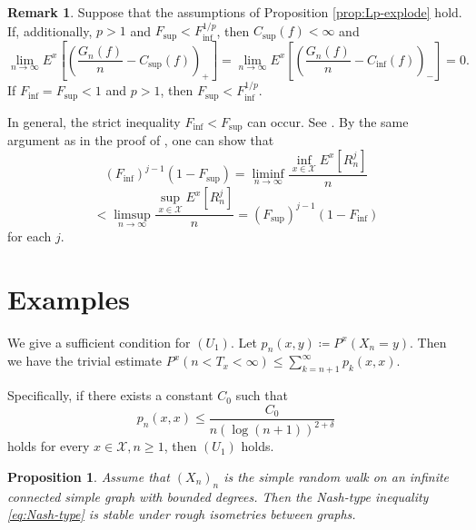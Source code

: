 \documentclass[a4paper, reqno, 11pt]{amsart}
\newtheorem{Prop}[Thm]{Proposition}
\theoremstyle{definition}
\newtheorem{Rem}[Thm]{Remark}
\begin{document}
\begin{Rem}
Suppose that the assumptions of Proposition \ref{prop:Lp-explode} hold. 
If, additionally, $p > 1$ and $F_{\sup} < F_{\inf}^{1/p}$, 
then $C_{\sup}(f) < \infty$ and 
\[ \lim_{n \to \infty} E^x \left[ \left( \frac{G_n (f)}{n} - C_{\sup}(f) \right)_{+} \right] =  \lim_{n \to \infty} E^x \left[ \left( \frac{G_n (f)}{n} - C_{\inf}(f) \right)_{-} \right] = 0. \] 
If $F_{\inf} = F_{\sup} < 1$ and $p >1$,  then $F_{\sup} < F_{\inf}^{1/p}$. 
\end{Rem}

In general, the strict inequality $F_{\inf} < F_{\sup}$ can occur. 
See \cite[Theorem 1.3]{Okamura2014}. 
By the same argument as in the proof of  \cite[Theorem 1.3]{Okamura2014}, 
one can show that 
\[ (F_{\inf})^{j-1} (1-F_{\sup}) =  \liminf_{n \to \infty} \frac{\inf_{x \in \mathcal{X}} E^{x} \left[R_n^j \right]}{n} \]
\[ < \limsup_{n \to \infty} \frac{\sup_{x \in \mathcal{X}} E^{x} \left[R_n^j \right]}{n} = (F_{\sup})^{j-1} (1-F_{\inf}) \]
for each $j$. 


\section{Examples}\label{sec:examples}

We give a sufficient condition for $(U_1)$. 
Let $p_n (x,y) \coloneqq P^x (X_n = y)$. 
Then we have the trivial estimate 
$P^x (n < T_x < \infty) \le \sum_{k=n+1}^{\infty} p_k (x,x)$. 

Specifically, if 
there exists a constant  $C_0$ such that
\begin{equation}\label{eq:Nash-type}
p_n (x,x) \le \frac{C_0}{n (\log (n+1))^{2+\delta}} 
\end{equation} 
holds for every $x \in \mathcal{X}, n \ge 1$, 
then $(U_1)$ holds. 

\begin{Prop}
Assume that $(X_n)_n$ is the simple random walk on an infinite connected simple graph with bounded degrees. 
Then the Nash-type inequality \eqref{eq:Nash-type}  is stable under rough isometries between graphs. 
\end{Prop}
\end{document}
